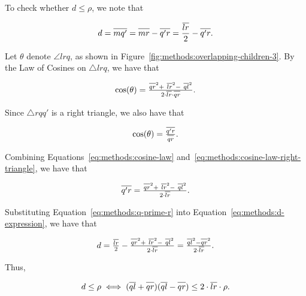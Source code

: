 To check whether $d \leq \rho$, we note that

\begin{equation}
    d = \overline{m q' \vphantom{l}} = \overline{m r \vphantom{l}} - \overline{q' r \vphantom{l}} = \frac{\overline{l r}}{2} - \overline{q' r \vphantom{l}}.
    \label{eq:methods:d-expression}
\end{equation}

Let $\theta$ denote $\angle l r q$, as shown in Figure~\ref{fig:methods:overlapping-children-3}.
By the Law of Cosines on $\triangle l r q$, we have that

\begin{equation}
    \text{cos}(\theta) = \tfrac{\overline{q r \vphantom{l}}^2 + \ \overline{l r}^2 - \ \overline{q l}^2}{2 \cdot \overline{l r} \cdot \overline{q r \vphantom{l}}}.
    \label{eq:methods:cosine-law}
\end{equation}

Since $\triangle r q q'$ is a right triangle, we also have that

\begin{equation}
    \text{cos}(\theta) = \tfrac{\overline{q' r \vphantom{l}}}{\overline{q r \vphantom{l}}}.
    \label{eq:methods:cosine-law-right-triangle}
\end{equation}

Combining Equations~\ref{eq:methods:cosine-law} and~\ref{eq:methods:cosine-law-right-triangle}, we have that

\begin{equation}
    \overline{q' r \vphantom{l}} = \tfrac{\overline{q r \vphantom{l}}^2 + \ \overline{l r}^2 - \ \overline{q l}^2}{2 \cdot \overline{l r}}.
    \label{eq:methods:q-prime-r}
\end{equation}

Substituting Equation~\ref{eq:methods:q-prime-r} into Equation~\ref{eq:methods:d-expression}, we have that

\begin{equation*}
    d = \tfrac{\overline{l r}}{2} - \tfrac{\overline{q r \vphantom{l}}^2 + \ \overline{l r}^2 - \ \overline{q l}^2}{2 \cdot \overline{l r}} = \tfrac{\overline{q l}^2 - \overline{q r \vphantom{l}}^2}{2 \cdot \overline{l r}}.
\end{equation*}

Thus,

\begin{equation}
    d \leq \rho \iff (\overline{q l} + \overline{q r \vphantom{l}})(\overline{q l} - \overline{q r \vphantom{l}}) \leq 2 \cdot \overline{l r} \cdot \rho.
    \label{eq:methods:check-d}
\end{equation}

